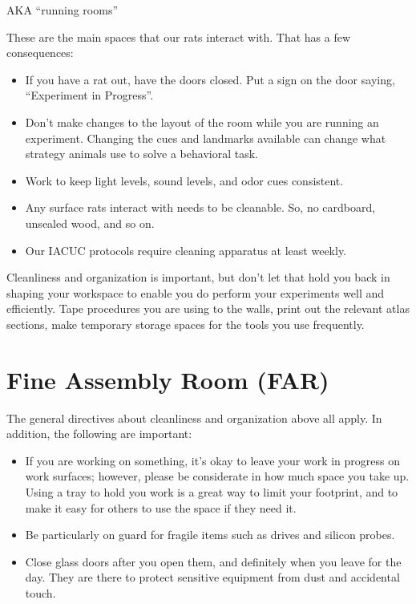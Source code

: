 \documentclass{tufte-book}
\begin{document}
AKA ``running rooms''

These are the main spaces that our rats interact with. That has a few
consequences:

\begin{itemize}
\item{If you have a rat out, have the doors closed. Put a sign on the
  door saying, ``Experiment in Progress''.}
\item{Don't make changes to the layout of the room while you are
  running an experiment. Changing the cues and landmarks available can
  change what strategy animals use to solve a behavioral task.}
\item{Work to keep light levels, sound levels, and odor cues
  consistent.}
\item{Any surface rats interact with needs to be cleanable. So, no
  cardboard, unsealed wood, and so on.}
\item{Our IACUC protocols require cleaning apparatus at least weekly.}
\end{itemize}

Cleanliness and organization is important, but don't let that hold you
back in shaping your workspace to enable you do perform your
experiments well and efficiently. Tape procedures you are using to the
walls, print out the relevant atlas sections, make temporary storage
spaces for the tools you use frequently.

\section{Fine Assembly Room (FAR)}

The general directives about cleanliness and organization above all
apply. In addition, the following are important:

\begin{itemize}
\item{If you are working on something, it's okay to leave your work in
progress on work surfaces; however, please be considerate in how much
space you take up. Using a tray to hold you work is a great way to
limit your footprint, and to make it easy for others to use the space
if they need it.}
\item{Be particularly on guard for fragile items such as drives and
  silicon probes.}
\item{Close glass doors after you open them, and definitely when you
  leave for the day. They are there to protect sensitive equipment
  from dust and accidental touch.}
\end{itemize}
\end{document}
